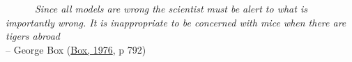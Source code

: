 \documentclass[
]{book}
\begin{document}
~~~~~~\emph{Since all models are wrong the scientist must be alert to what is importantly wrong. It is inappropriate to be concerned with mice when there are tigers abroad}\\
\hspace*{0.333em}\hspace*{0.333em}\hspace*{0.333em}\hspace*{0.333em}\hspace*{0.333em}\hspace*{0.333em}\hspace*{0.333em}\hspace*{0.333em}\hspace*{0.333em}\hspace*{0.333em}\hspace*{0.333em}\hspace*{0.333em}\hspace*{0.333em}\hspace*{0.333em}\hspace*{0.333em}\hspace*{0.333em}\hspace*{0.333em}\hspace*{0.333em}\hspace*{0.333em}\hspace*{0.333em}\hspace*{0.333em}\hspace*{0.333em}\hspace*{0.333em}\hspace*{0.333em}\hspace*{0.333em}\hspace*{0.333em}\hspace*{0.333em}\hspace*{0.333em}\hspace*{0.333em}\hspace*{0.333em}-- George Box (\protect\hyperlink{ref-Box1976}{Box, 1976}, p 792)
\end{document}
